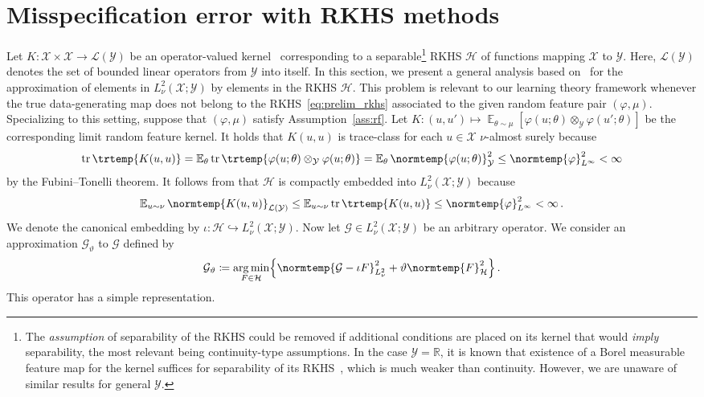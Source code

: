 \documentclass{article}
\theoremstyle{plain}
\theoremstyle{my_def}
\theoremstyle{my_rem}
\numberwithin{equation}{section}
\numberwithin{theorem}{section}%
\newcommand{\R}{\mathbb{R}}
\newcommand{\E}{\mathbb{E}}
\newcommand{\cG}{\mathcal{G}}
\newcommand{\cH}{\mathcal{H}}
\newcommand{\cL}{\mathcal{L}}
\newcommand{\cX}{\mathcal{X}}
\newcommand{\cY}{\mathcal{Y}}
\newcommand{\norm}{\normtemp}
\newcommand{\tr}{\operatorname{tr}\trtemp}
\newcommand{\defeq}{\coloneqq} %
\renewcommand{\E}{\operatorname{\mathbb{E}}} %
\DeclareMathOperator*{\argmin}{arg\,min}
\renewcommand{\phi}{\varphi}
\begin{document}
\section{Misspecification error with RKHS methods}
\label{app:rkhs}
Let $K\colon\cX\times\cX\to\cL(\cY)$ be an operator-valued kernel~\cite{rfm} corresponding to a separable\footnote{The \emph{assumption} of separability of the RKHS could be removed if additional conditions are placed on its kernel that would \emph{imply} separability, the most relevant being continuity-type assumptions. In the case $\cY=\R$, it is known that existence of a Borel measurable feature map for the kernel suffices for separability of its RKHS~\cite{owhadi2017separability}, which is much weaker than continuity. However, we are unaware of similar results for general $\cY$.} RKHS $\cH$ of functions mapping $\cX$ to $\cY$. Here, $\cL(\cY)$ denotes the set of bounded linear operators from $\cY$ into itself. In this section, we present a general analysis based on~\cite{smale2005shannon} for the approximation of elements in $L^2_\nu(\cX;\cY)$ by elements in the RKHS $\cH$. This problem is relevant to our learning theory framework whenever the true data-generating map does not belong to the RKHS~\eqref{eq:prelim_rkhs} associated to the given random feature pair $(\phi,\mu)$. Specializing to this setting, suppose that $(\phi,\mu)$ satisfy Assumption~\ref{ass:rf}. Let $K\colon (u,u')\mapsto \E_{\theta\sim\mu}[\phi(u;\theta)\otimes_{\cY}\phi(u';\theta)]$ be the corresponding limit random feature kernel. It holds that $K(u,u)$ is trace-class for each $u\in\cX$ $\nu$-almost surely because
\begin{equation}
\tr{K(u,u)}=\E_{\theta}\tr{\phi(u;\theta)\otimes_{\cY}\phi(u;\theta)}=\E_\theta\norm{\phi(u;\theta)}_{\cY}^2\leq\norm{\phi}_{L^\infty}^2<\infty
\end{equation}
by the Fubini--Tonelli theorem. It follows from \cite[Prop. 4.8, p. 394]{carmeli2006vector} that $\cH$ is compactly embedded into $L^2_\nu(\cX;\cY)$ because
\begin{equation}
    \E_{u\sim\nu}\norm{K(u,u)}_{\cL(\cY)}\leq \E_{u\sim\nu}\tr{K(u,u)}\leq \norm{\phi}_{L^\infty}^2<\infty\,.
\end{equation}
We denote the canonical embedding by $\iota\colon \cH\hookrightarrow L^2_\nu(\cX;\cY)$. Now let $\cG\in L^2_\nu(\cX;\cY)$ be an arbitrary operator. We consider an approximation $\cG_\vartheta$ to $\cG$ defined by
\begin{equation}\label{eq:rkhs_approx}
    \cG_\vartheta \defeq \argmin_{F\in\cH}\Bigl\{\norm{\cG - \iota F}_{L^2_\nu}^2 + \vartheta \norm{F}_{\cH}^2\Bigr\}\, .
\end{equation}
This operator has a simple representation.
\end{document}
